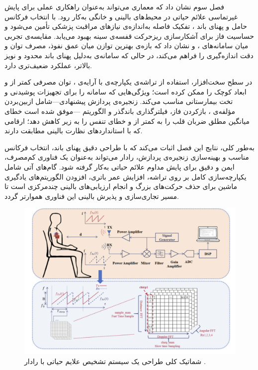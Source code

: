 
فصل سوم نشان داد که معماری  می‌تواند به‌عنوان راهکاری عملی برای پایش غیرتماسی علائم حیاتی در محیط‌های بالینی و خانگی به‌کار رود. با انتخاب فرکانس حامل  و پهنای باند ، تفکیک فاصله به‌اندازه‌ی نیازهای مراقبت پزشکی تأمین می‌شود و حساسیت فاز برای آشکارسازی ریزحرکت قفسه‌ی سینه بهبود می‌یابد. مقایسه‌ی تجربی میان سامانه‌های ،  و  نشان داد که بازه‌ی  بهترین توازن میان عمق نفوذ، مصرف توان و دقت اندازه‌گیری را فراهم می‌کند، در حالی که سامانه‌ی  به‌دلیل پهنای باند محدود و نویز بالاتر، عملکرد ضعیف‌تری دارد.

در سطح سخت‌افزار، استفاده از تراشه‌ی یکپارچه‌ی  با آرایه‌ی ، توان مصرفی کمتر از  و ابعاد کوچک را ممکن کرده است؛ ویژگی‌هایی که سامانه را برای تجهیزات پوشیدنی و تخت بیمارستانی مناسب می‌کند. زنجیره‌ی پردازش پیشنهادی—شامل ازبین‌بردن مؤلفه‌ی ، بازکردن فاز، فیلترگذاری باندگذر و الگوریتم —موفق شده است خطای میانگین مطلق ضربان قلب را به کمتر از  و خطای تنفس را به زیر  کاهش دهد؛ ارقامی که با استانداردهای نظارت بالینی مطابقت دارند.

به‌طور کلی، نتایج این فصل اثبات می‌کند که با طراحی دقیق پهنای باند، انتخاب فرکانس مناسب و بهینه‌سازی زنجیره‌ی پردازش، رادار  می‌تواند به‌عنوان یک فناوری کم‌مصرف، ایمن و دقیق برای پایش مداوم علائم حیاتی به‌کار گرفته شود. گام‌های آتی شامل یکپارچه‌سازی کامل بر روی تراشه، افزایش عمر باتری، افزودن الگوریتم‌های یادگیری ماشین برای حذف حرکت‌های بزرگ و انجام ارزیابی‌های بالینی چندمرکزی است تا مسیر تجاری‌سازی و پذیرش بالینی این فناوری هموارتر گردد.



\begin{figure}[ht]
    \centering
    \includegraphics[width=0.7\linewidth]{Images/chapter3/3-4.png}
    \caption{
    شماتیک کلی طراحی یک سیستم تشخیص علايم حیاتی با رادار  
    \cite{hao2025fmcw}.}
    \label{fig:fmcw_vitals}
\end{figure}